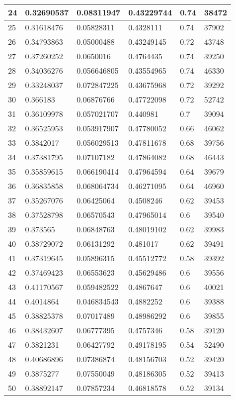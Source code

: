 \begin{longtable}{|l|l|l|l|l|l|}
24 & 0.32690537 & 0.08311947 & 0.43229744 & 0.74 & 38472 \\ \hline 
25 & 0.31618476 & 0.05828311 & 0.4328111 & 0.74 & 37902 \\ \hline 
26 & 0.34793863 & 0.05000488 & 0.43249145 & 0.72 & 43748 \\ \hline 
27 & 0.37260252 & 0.0650016 & 0.4764435 & 0.74 & 39250 \\ \hline 
28 & 0.34036276 & 0.056646805 & 0.43554965 & 0.74 & 46330 \\ \hline 
29 & 0.33248037 & 0.072847225 & 0.43675968 & 0.72 & 39292 \\ \hline 
30 & 0.366183 & 0.06876766 & 0.47722098 & 0.72 & 52742 \\ \hline 
31 & 0.36109978 & 0.057021707 & 0.440981 & 0.7 & 39094 \\ \hline 
32 & 0.36525953 & 0.053917907 & 0.47780052 & 0.66 & 46062 \\ \hline 
33 & 0.3842017 & 0.056029513 & 0.47811678 & 0.68 & 39756 \\ \hline 
34 & 0.37381795 & 0.07107182 & 0.47864082 & 0.68 & 46443 \\ \hline 
35 & 0.35859615 & 0.066190414 & 0.47964594 & 0.64 & 39679 \\ \hline 
36 & 0.36835858 & 0.068064734 & 0.46271095 & 0.64 & 46960 \\ \hline 
37 & 0.35267076 & 0.06425064 & 0.4508246 & 0.62 & 39453 \\ \hline 
38 & 0.37528798 & 0.06570543 & 0.47965014 & 0.6 & 39540 \\ \hline 
39 & 0.373565 & 0.06848763 & 0.48019102 & 0.62 & 39983 \\ \hline 
40 & 0.38729072 & 0.06131292 & 0.481017 & 0.62 & 39491 \\ \hline 
41 & 0.37319645 & 0.05896315 & 0.45512772 & 0.58 & 39392 \\ \hline 
42 & 0.37469423 & 0.06553623 & 0.45629486 & 0.6 & 39556 \\ \hline 
43 & 0.41170567 & 0.059482522 & 0.4867647 & 0.6 & 40021 \\ \hline 
44 & 0.4014864 & 0.046834543 & 0.4882252 & 0.6 & 39388 \\ \hline 
45 & 0.38825378 & 0.07017489 & 0.48986292 & 0.6 & 39855 \\ \hline 
46 & 0.38432607 & 0.06777395 & 0.4757346 & 0.58 & 39120 \\ \hline 
47 & 0.3821231 & 0.06427792 & 0.49178195 & 0.54 & 52490 \\ \hline 
48 & 0.40686896 & 0.07386874 & 0.48156703 & 0.52 & 39420 \\ \hline 
49 & 0.3875277 & 0.07550049 & 0.48186305 & 0.52 & 39413 \\ \hline 
50 & 0.38892147 & 0.07857234 & 0.46818578 & 0.52 & 39134 \\ \hline 
\end{longtable}